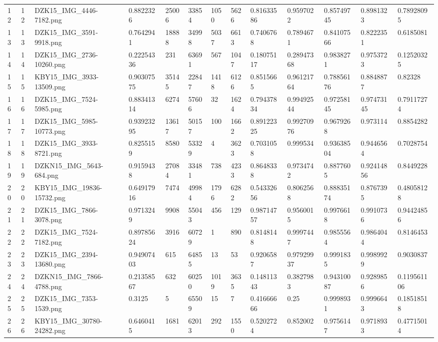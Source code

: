 \documentclass[11pt, a4paper, twoside]{report}
\begin{document}
\begin{longtable}[c]{@{}lllllllllllll@{}}
12 & 12 & DZK15\_IMG\_4446-7182.png & 0.8822326 & 25006 & 33854 & 1050 & 5626 & 0.81633586 & 0.9597022 & 0.85749745 & 0.8981323 & 0.78928095 \\
13 & 13 & DZK15\_IMG\_3591-9918.png & 0.7642941 & 18888 & 34998 & 5037 & 6613 & 0.7406768 & 0.7894671 & 0.84107566 & 0.8222351 & 0.6185081 \\
14 & 14 & DZK15\_IMG\_2736-10260.png & 0.22254336 & 231 & 63691 & 567 & 1047 & 0.18075117 & 0.28947368 & 0.9838271 & 0.9753723 & 0.12520325 \\
15 & 15 & KBY15\_IMG\_3933-13509.png & 0.90307575 & 35145 & 22847 & 1418 & 6126 & 0.8515665 & 0.96121764 & 0.78856176 & 0.8848877 & 0.82328 \\
16 & 16 & DZK15\_IMG\_7524-5985.png & 0.88341314 & 6274 & 57606 & 32 & 1624 & 0.79437834 & 0.99492544 & 0.97258145 & 0.97473145 & 0.79117274 \\
17 & 17 & DZK15\_IMG\_5985-10773.png & 0.93923295 & 13617 & 50157 & 100 & 1662 & 0.89122325 & 0.99270976 & 0.9679268 & 0.973114 & 0.8854282 \\
18 & 18 & DZK15\_IMG\_3933-8721.png & 0.8255159 & 8580 & 53329 & 4 & 3623 & 0.7031058 & 0.999534 & 0.93638504 & 0.9446564 & 0.7028754 \\
19 & 19 & DZKN15\_IMG\_5643-684.png & 0.9159438 & 27084 & 33481 & 738 & 4233 & 0.8648338 & 0.9734742 & 0.8877605 & 0.92414856 & 0.8449228 \\
20 & 20 & KBY15\_IMG\_19836-15732.png & 0.64917916 & 7474 & 49984 & 1796 & 6282 & 0.54332656 & 0.8062568 & 0.88835174 & 0.8767395 & 0.48058128 \\
21 & 21 & DZK15\_IMG\_7866-3078.png & 0.9713249 & 9908 & 55043 & 456 & 129 & 0.98714757 & 0.9560015 & 0.9976618 & 0.9910736 & 0.94424856 \\
22 & 22 & DZK15\_IMG\_7524-7182.png & 0.89785624 & 3916 & 60729 & 1 & 890 & 0.8148148 & 0.9997447 & 0.9855564 & 0.9864044 & 0.8146453 \\
23 & 23 & DZK15\_IMG\_2394-13680.png & 0.94907403 & 615 & 64855 & 13 & 53 & 0.9206587 & 0.97929937 & 0.9991835 & 0.9989929 & 0.9030837 \\
24 & 24 & DZKN15\_IMG\_7866-4788.png & 0.21358567 & 632 & 60250 & 1019 & 3635 & 0.14811343 & 0.3827983 & 0.94310087 & 0.9289856 & 0.119561106 \\
25 & 25 & DZK15\_IMG\_7353-1539.png & 0.3125 & 5 & 65509 & 15 & 7 & 0.41666666 & 0.25 & 0.9998931 & 0.9996643 & 0.18518518 \\
26 & 26 & KBY15\_IMG\_30780-24282.png & 0.6460415 & 1681 & 62013 & 292 & 1550 & 0.5202724 & 0.852002 & 0.9756147 & 0.9718933 & 0.47715014 \\

\end{longtable}
\end{document}
